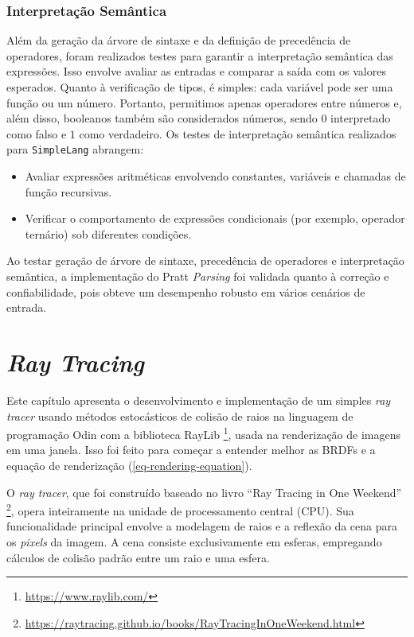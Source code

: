 \documentclass[english, 
               brazil, 
               bsc] %
               {dcomp-abntex2}
\begin{document}
\subsubsection{Interpretação Semântica}

Além da geração da árvore de sintaxe e da definição de precedência de operadores, foram realizados testes para garantir a interpretação semântica das expressões. Isso envolve avaliar as entradas e comparar a saída com os valores esperados. Quanto à verificação de tipos, é simples: cada variável pode ser uma função ou um número. Portanto, permitimos apenas operadores entre números e, além disso, booleanos também são considerados números, sendo $0$ interpretado como falso e $1$ como verdadeiro. Os testes de interpretação semântica realizados para \texttt{SimpleLang} abrangem:


\begin{itemize}
    \item Avaliar expressões aritméticas envolvendo constantes, variáveis e chamadas de função recursivas.
    \item Verificar o comportamento de expressões condicionais (por exemplo, operador ternário) sob diferentes condições.
\end{itemize}


Ao testar geração de árvore de sintaxe, precedência de operadores e interpretação semântica, a implementação do Pratt \textit{Parsing} foi validada quanto à correção e confiabilidade, pois obteve um desempenho robusto em vários cenários de entrada.


\section{\textit{Ray Tracing} } \label{raytracer}




Este capítulo apresenta o desenvolvimento e implementação de um simples \textit{ray tracer} usando métodos estocásticos de colisão de raios na linguagem de programação Odin com a biblioteca RayLib \footnote{\url{https://www.raylib.com/}}, usada na renderização de imagens em uma janela. Isso foi feito para começar a entender melhor as BRDFs e a equação de renderização (\autoref{eq-rendering-equation}).


O \textit{ray tracer}, que foi construído baseado no livro ``Ray Tracing in One Weekend'' \footnote{\url{https://raytracing.github.io/books/RayTracingInOneWeekend.html}}, opera inteiramente na unidade de processamento central (CPU). Sua funcionalidade principal envolve a modelagem de raios e a reflexão da cena para os \textit{pixels} da imagem. A cena consiste exclusivamente em esferas, empregando cálculos de colisão padrão entre um raio e uma esfera.
\end{document}

